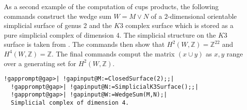 \documentclass[a4paper,11pt]{report}
\begin{document}
{{ As a second example of the computation of cups products, the following
commands construct the wedge sum $W=M\vee N$ of a $2$-dimensional orientable simplicial surface of genus 2 and the $K3$ complex surface which is stored as a pure simplicial complex of dimension 4.
The simplicial structure on the $K3$ surface is taken from \cite{spreerkhuenel}. The commands then show that $H^2(W,\mathbb Z)=\mathbb Z^{22}$ and $H^4(W,\mathbb Z)=\mathbb Z$. The final commands comput the matrix $(x\cup y)$ as $x,y$ range over a generating set for $H^2(W,\mathbb Z)$. 
\begin{Verbatim}[commandchars=!@|,fontsize=\small,frame=single,label=Example]
  !gapprompt@gap>| !gapinput@M:=ClosedSurface(2);;|
  !gapprompt@gap>| !gapinput@N:=SimplicialK3Surface();;|
  !gapprompt@gap>| !gapinput@W:=WedgeSum(M,N);|
  Simplicial complex of dimension 4.
  

\end{Verbatim}}}
\end{document}
